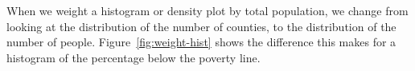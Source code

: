 %


When we weight a histogram or density plot by total population, we change from looking at the distribution of the number of counties, to the distribution of the number of people.  Figure~\ref{fig:weight-hist} shows the difference this makes for a histogram of the percentage below the poverty line.

%



